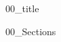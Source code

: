 \documentclass{article}
\begin{document}
{00_title}

\frontmatter

\tableofcontents



\mainmatter


{00_Sections}


\newpage
\printbibliography[heading = bibintoc]    %

\newpage
\listoffigures
\listoftables

\end{document}
